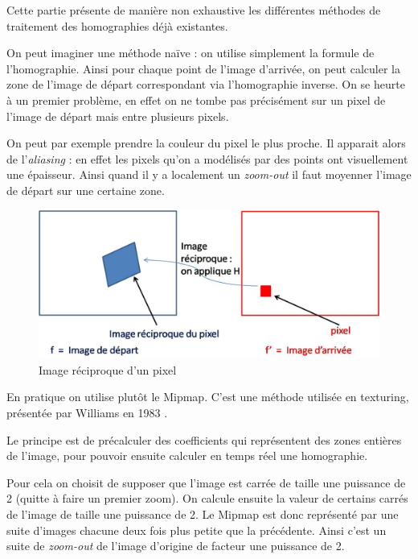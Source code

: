   Cette partie présente de manière non exhaustive les différentes méthodes de traitement des homographies déjà existantes.



On peut imaginer une méthode naïve : on utilise simplement la formule de l'homographie. Ainsi pour chaque point de l'image d'arrivée, on peut calculer la zone de l'image de départ correspondant via l'homographie inverse. On se heurte à un premier problème, en effet on ne tombe pas précisément sur un pixel de l'image de départ mais entre plusieurs pixels. 

On peut par exemple prendre la couleur du pixel le plus proche. Il apparait alors de l'\emph{aliasing} : en effet les pixels qu'on a modélisés par des points ont visuellement une épaisseur. Ainsi quand il y a localement un \emph{zoom-out} il faut moyenner l'image de départ sur une certaine zone.


\begin{figure}[h!]
\centering
\includegraphics[scale=0.5]{imagereciproque.jpg}
\caption{Image réciproque d'un pixel}
\end{figure}

En pratique on utilise plutôt le Mipmap. C'est une méthode utilisée en texturing, présentée par Williams en 1983 \cite{williams1983pyramidal}.


Le principe est de précalculer des coefficients qui représentent des zones entières de l'image, pour pouvoir ensuite calculer en temps réel une homographie. 

Pour cela on choisit de supposer que l'image est carrée de taille une puissance de 2 (quitte à faire un premier zoom). On calcule ensuite la valeur de certains carrés de l'image de taille une puissance de 2.
Le Mipmap est donc représenté par une suite d'images chacune deux fois plus petite que la précédente. Ainsi c'est un suite de \emph{zoom-out} de l'image d'origine de facteur une puissance de 2.

